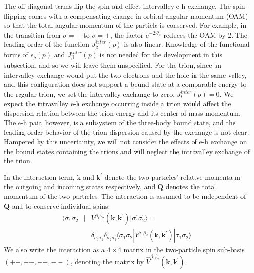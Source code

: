 \documentclass[aps,prb,superscriptaddress,letterpaper,amsmath,amssymb,twocolumn,preprintnumbers]{revtex4}
\begin{document}
The off-diagonal terms flip the spin and effect intervalley e-h exchange. The spin-flipping comes with a compensating change in orbital angular momentum (OAM) so that the total angular momentum of the particle is conserved. For example, in the transition from $\sigma = -$ to $\sigma = +$, the factor $e^{- 2 i \theta_p}$ reduces the OAM by 2. The leading order of the function $J^{inter}_{\beta} (p)$ is also linear. Knowledge of the functional forms of $\epsilon^{}_{\beta} (p)$ and $J^{inter}_{\beta} (p)$ is not needed for the development in this subsection, and so we will leave them unspecified. For the trion, since an intervalley exchange would put the two electrons and the hole in the same valley, and this configuration does not support a bound state at a comparable energy to the regular trion, we set the intervalley exchange to zero, $J^{inter}_{t} (p) = 0$. We expect the intravalley e-h exchange occurring inside a trion would affect the dispersion relation between the trion energy and its center-of-mass momentum. The e-h pair, however, is a subsystem of the three-body bound state, and the leading-order behavior of the trion dispersion caused by the exchange is not clear. Hampered by this uncertainty, we will not consider the effects of e-h exchange on the bound states containing the trions and will neglect the intravalley exchange of the trion.

In the interaction term, $\mathbf{k}$ and $\mathbf{k}^{\prime}$ denote the two particles' relative momenta in the outgoing and incoming states respectively, and $\mathbf{Q}$ denotes the total momentum of the two particles. The interaction is assumed to be independent of $\mathbf{Q}$ and to conserve individual spins:
\begin{eqnarray}\label{V-spin.equ}
\langle \sigma_1   \sigma_2 & | & V^{\beta_1 \beta_2} (\mathbf{k} , \mathbf{k}^{\prime}) | \sigma^{\prime}_1 \sigma^{\prime}_2 \rangle = \nonumber \\
&& \delta_{\sigma_1 \sigma^{\prime}_1} \delta_{\sigma_2 \sigma^{\prime}_2} \langle \sigma_1 \sigma_2 | V^{\beta_1 \beta_2} (\mathbf{k} , \mathbf{k}^{\prime}) | \sigma_1 \sigma_2 \rangle
\end{eqnarray}
We also write the interaction as a $4 \times 4$ matrix in the two-particle spin sub-basis $(++ , +- , -+ , --)$, denoting the matrix by $\hat{V}^{\beta_1 \beta_2} (\mathbf{k},\mathbf{k}^{\prime})$.
\end{document}
